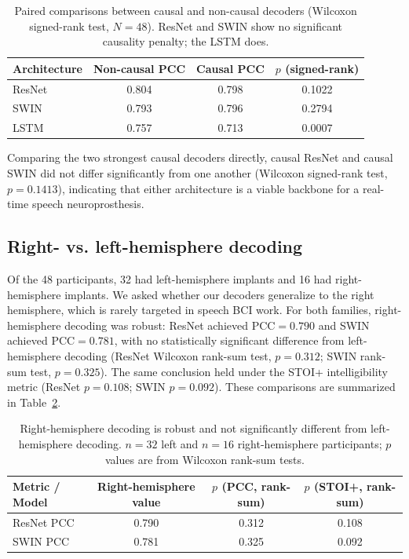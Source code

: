 \documentclass[11pt]{article}
\begin{document}
\begin{table}[h]
\centering
\caption{Paired comparisons between causal and non-causal decoders (Wilcoxon signed-rank test, $N=48$). ResNet and SWIN show no significant causality penalty; the LSTM does.}
\label{tab:causal}
\begin{tabular}{lccc}
\toprule
Architecture & Non-causal PCC & Causal PCC & $p$ (signed-rank) \\
\midrule
ResNet & 0.804 & 0.798 & 0.1022 \\
SWIN   & 0.793 & 0.796 & 0.2794 \\
LSTM   & 0.757 & 0.713 & 0.0007 \\
\bottomrule
\end{tabular}
\end{table}

Comparing the two strongest causal decoders directly, causal ResNet and causal SWIN did not differ significantly from one another (Wilcoxon signed-rank test, $p = 0.1413$), indicating that either architecture is a viable backbone for a real-time speech neuroprosthesis.

\subsection{Right- vs. left-hemisphere decoding}
Of the 48 participants, 32 had left-hemisphere implants and 16 had right-hemisphere implants. We asked whether our decoders generalize to the right hemisphere, which is rarely targeted in speech BCI work. For both families, right-hemisphere decoding was robust: ResNet achieved $\mathrm{PCC} = 0.790$ and SWIN achieved $\mathrm{PCC} = 0.781$, with no statistically significant difference from left-hemisphere decoding (ResNet Wilcoxon rank-sum test, $p = 0.312$; SWIN rank-sum test, $p = 0.325$). The same conclusion held under the STOI+ intelligibility metric (ResNet $p = 0.108$; SWIN $p = 0.092$). These comparisons are summarized in Table~\ref{tab:hemi}.

\begin{table}[h]
\centering
\caption{Right-hemisphere decoding is robust and not significantly different from left-hemisphere decoding. $n=32$ left and $n=16$ right-hemisphere participants; $p$ values are from Wilcoxon rank-sum tests.}
\label{tab:hemi}
\begin{tabular}{lccc}
\toprule
Metric / Model & Right-hemisphere value & $p$ (PCC, rank-sum) & $p$ (STOI+, rank-sum) \\
\midrule
ResNet PCC & 0.790 & 0.312 & 0.108 \\
SWIN   PCC & 0.781 & 0.325 & 0.092 \\
\bottomrule
\end{tabular}
\end{table}
\end{document}

